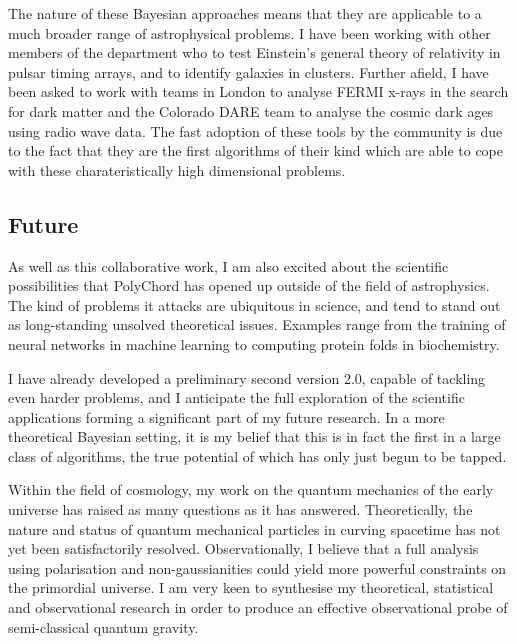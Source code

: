The nature of these Bayesian approaches means that they are applicable to a much broader range of astrophysical problems. I have been working with other members of the department who to test Einstein's general theory of relativity in pulsar timing arrays, and to identify galaxies in clusters. Further afield, I have been asked to work with teams in London to analyse FERMI x-rays in the search for dark matter and the Colorado DARE team to analyse the cosmic dark ages using radio wave data. The fast adoption of these tools by the community is due to the fact that they are the first algorithms of their kind which are able to cope with these charateristically high dimensional problems.

\subsection{Future}
As well as this collaborative work, I am also excited about the scientific possibilities that PolyChord has opened up outside of the field of astrophysics. The kind of problems it attacks are ubiquitous in science, and tend to stand out as long-standing unsolved theoretical issues. Examples range from the training of neural networks in machine learning to computing protein folds in biochemistry.

I have already developed a preliminary second version 2.0, capable of tackling even harder problems, and I anticipate the full exploration of the scientific applications forming a significant part of my future research. In a more theoretical Bayesian setting, it is my belief that this is in fact the first in a large class of algorithms, the true potential of which has only just begun to be tapped.

Within the field of cosmology, my work on the quantum mechanics of the early universe has raised as many questions as it has answered.  Theoretically, the nature and status of quantum mechanical particles in curving spacetime has not yet been satisfactorily resolved.  Observationally, I believe that a full analysis using polarisation and non-gaussianities could yield more powerful constraints on the primordial universe. I am very keen to synthesise my theoretical, statistical and observational research in order to produce an effective observational probe of semi-classical quantum gravity.
